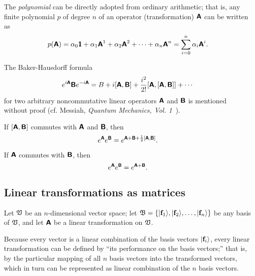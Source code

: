 The {\em polynomial}
can be directly adopted from ordinary arithmetic; that is,
any finite polynomial $p$ of degree $n$
of an operator (transformation) $\textsf{\textbf{A}}$ can be written as
\begin{equation}
p(\textsf{\textbf{A}})= \alpha_0   \textsf{\textbf{1}}
+ \alpha_1   \textsf{\textbf{A}}^1
+ \alpha_2   \textsf{\textbf{A}}^2+
\cdots
+
\alpha_n   \textsf{\textbf{A}}^n
=\sum_{i=0}^n \alpha_i \textsf{\textbf{A}}^i
.
\end{equation}

The Baker-Hausdorff formula
 \begin{equation}
 e^{i\textsf{\textbf{A}}}\textsf{\textbf{B}}e^{-i\textsf{\textbf{A}}}=
B+i[\textsf{\textbf{A}},\textsf{\textbf{B}}]+
{i^2\over 2!}[\textsf{\textbf{A}},[\textsf{\textbf{A}},\textsf{\textbf{B}}]]+\cdots
 \end{equation}
for two arbitrary noncommutative linear operators $\textsf{\textbf{A}}$ and
$\textsf{\textbf{B}}$ is mentioned without proof
(cf.  Messiah, {\sl Quantum Mechanics, Vol. 1}~\cite{messiah-61}).

If $[\textsf{\textbf{A}},\textsf{\textbf{B}}]$ commutes with $\textsf{\textbf{A}}$ and
$\textsf{\textbf{B}}$, then
 \begin{equation}
 e^\textsf{\textbf{A}}e^\textsf{\textbf{B}}=
e^{\textsf{\textbf{A}}+\textsf{\textbf{B}}+{1\over 2}\left[\textsf{\textbf{A}},\textsf{\textbf{B}}\right]}.
 \end{equation}

If  $\textsf{\textbf{A}}$ commutes with $\textsf{\textbf{B}}$, then
 \begin{equation}
 e^\textsf{\textbf{A}}e^\textsf{\textbf{B}}=
e^{\textsf{\textbf{A}}+\textsf{\textbf{B}}}.
 \end{equation}

\subsection{Linear transformations as matrices}




Let ${\frak V}$ be an $n$-dimensional vector space;
let
${\frak B}=\{\vert {\bf f}_1 \rangle ,\vert {\bf f}_2 \rangle,\ldots ,\vert {\bf f}_n \rangle\}$ be any basis of ${\frak V}$,
and let  $\textsf{\textbf{A}}$ be a linear transformation on ${\frak V}$.

Because every vector is a linear combination of the basis vectors
$\vert {\bf f}_i \rangle$,
every linear transformation can be defined by
``its performance on the basis vectors;'' that is,
by the particular mapping of
all $n$ basis vectors into the transformed vectors, which in turn can be represented as linear combination of the $n$ basis vectors.


